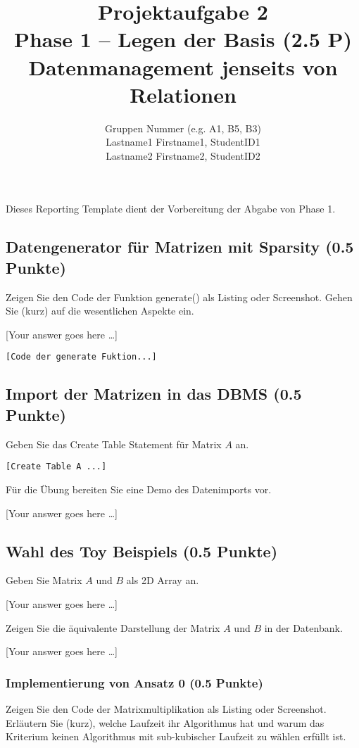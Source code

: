 \documentclass[11pt]{scrartcl}
\title{
  \textbf{\large Projektaufgabe 2 } \\
  Phase 1 – Legen der Basis (2.5 P) \\
  {\large Datenmanagement jenseits von Relationen}
}
\author{
  Gruppen Nummer (e.g. A1, B5, B3) \\
  \large Lastname1 Firstname1, StudentID1 \\
  \large Lastname2 Firstname2, StudentID2 
}
\newcommand{\youranswerhere}{[Your answer goes here \ldots]}
\begin{document}
\maketitle\thispagestyle{empty}

Dieses Reporting Template dient der Vorbereitung der Abgabe von Phase 1.

\subsection*{Datengenerator für Matrizen mit Sparsity (0.5 Punkte)}

Zeigen Sie den Code der Funktion generate() als Listing oder Screenshot. Gehen Sie (kurz) auf die wesentlichen Aspekte ein. 

\youranswerhere{}

\begin{lstlisting}[style=dmrJava]
[Code der generate Fuktion...]
\end{lstlisting}

\subsection*{Import der Matrizen in das DBMS (0.5 Punkte)}

Geben Sie das Create Table Statement für Matrix $A$ an.

\begin{lstlisting}[style=dmrsql]
[Create Table A ...]
\end{lstlisting}

Für die Übung bereiten Sie eine Demo des Datenimports vor.


\youranswerhere{}

\subsection*{Wahl des Toy Beispiels (0.5 Punkte)}

Geben Sie Matrix $A$ und $B$ als 2D Array an.

\youranswerhere{}

Zeigen Sie die äquivalente Darstellung der Matrix $A$ und $B$ in der Datenbank.

\youranswerhere{}

\subsubsection*{Implementierung von Ansatz 0 (0.5 Punkte)}

Zeigen Sie den Code der Matrixmultiplikation als Listing oder Screenshot. Erläutern Sie (kurz), welche Laufzeit ihr Algorithmus hat und warum das Kriterium keinen Algorithmus mit sub-kubischer Laufzeit zu wählen erfüllt ist. 
\end{document}
